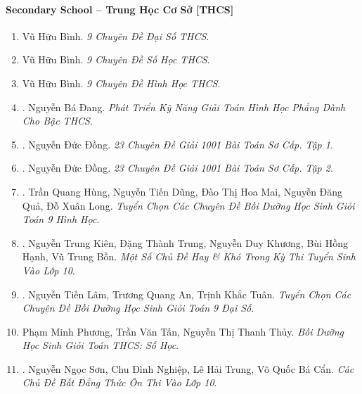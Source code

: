 \documentclass{article}
\begin{document}
\paragraph{Secondary School -- Trung Học Cơ Sở [THCS]}

\begin{enumerate}
	\item Vũ Hữu Bình. {\it 9 Chuyên Đề Đại Số THCS}.
	
	\item Vũ Hữu Bình. {\it 9 Chuyên Đề Số Học THCS}.
	
	\item Vũ Hữu Bình. {\it 9 Chuyên Đề Hình Học THCS}.
	
	\item \cite{Dang2018}. Nguyễn Bá Đang. {\it Phát Triển Kỹ Năng Giải Toán Hình Học Phẳng Dành Cho Bậc THCS}.\hfill{\sf[reading]}
	
	\item \cite{Dong_23_1001_toan_I}. Nguyễn Đức Đồng. {\it 23 Chuyên Đề Giải 1001 Bài Toán Sơ Cấp. Tập 1}.\hfill{\sf[reading]}
	
	\item \cite{Dong_23_1001_toan_II}. Nguyễn Đức Đồng. {\it 23 Chuyên Đề Giải 1001 Bài Toán Sơ Cấp. Tập 2}.\hfill{\sf[reading]}
	
	\item \cite{Hung_Dung_Mai_Qua_Long_Toan_9_hinh_hoc}. Trần Quang Hùng, Nguyễn Tiến Dũng, Đào Thị Hoa Mai, Nguyễn Đăng Quả, Đỗ Xuân Long. {\it Tuyển Chọn Các Chuyên Đề Bồi Dưỡng Học Sinh Giỏi Toán 9 Hình Học}.\hfill{\sf[reading]}
	
	\item \cite{Kien_Trung_Khuong_Hanh_Bon}. Nguyễn Trung Kiên, Đặng Thành Trung, Nguyễn Duy Khương, Bùi Hồng Hạnh, Vũ Trung Bồn. {\it Một Số Chủ Đề Hay \& Khó Trong Kỳ Thi Tuyển Sinh Vào Lớp 10}.\hfill{\sf[reading]}
	
	\item \cite{Lam_An_Tuan_Toan_9_dai_so}. Nguyễn Tiến Lâm, Trương Quang An, Trịnh Khắc Tuân. {\it Tuyển Chọn Các Chuyên Đề Bồi Dưỡng Học Sinh Giỏi Toán 9 Đại Số}.\hfill{\sf[reading]}
	
	\item Phạm Minh Phương, Trần Văn Tấn, Nguyễn Thị Thanh Thủy. {\it Bồi Dưỡng Học Sinh Giỏi Toán THCS: Số Học}.
	
	\item \cite{Son_Nghiep_Trung_Can_bdt}. Nguyễn Ngọc Sơn, Chu Đình Nghiệp, Lê Hải Trung, Võ Quốc Bá Cẩn. {\it Các Chủ Đề Bất Đẳng Thức Ôn Thi Vào Lớp 10}.\hfill{\sf[reading]}
	

\end{enumerate}
\end{document}
